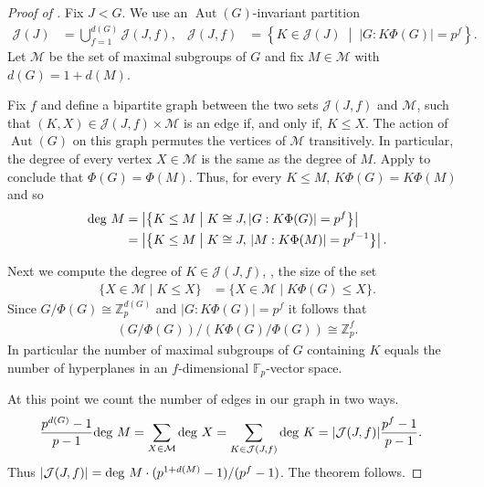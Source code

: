 \documentclass{toc}
\numberwithin{equation}{section}
\theoremstyle{plain}       %
\theoremstyle{remark}
\theoremstyle{definition}
\numberwithin{figure}{section}
\numberwithin{table}{section}
\newcommand{\bbF}{\mathbb{F}}  %
\DeclareMathOperator{\Aut}{Aut}  %
\begin{document}
\begin{proof}[Proof of ]
Fix $J<G$.  We use an $\Aut(G)$-invariant partition
\begin{align*}
	\mathcal{J}(J) & = \bigcup_{f=1}^{d(G)} \mathcal{J}(J,f),
&	\mathcal{J}(J,f) & = 
		\left\{K \in \mathcal{J}(J) \;\middle|\; |G:K\Phi(G)|=p^f\right\}.
\end{align*}
Let $\mathcal{M}$ be the set of maximal subgroups of $G$ and fix $M\in \mathcal{M}$ with $d(G)=1+d(M)$.

%
Fix $f$ and define a bipartite graph between the two sets $\mathcal{J}(J,f)$ and
$\mathcal{M}$, such that $(K,X)\in \mathcal{J}(J,f)\times \mathcal{M}$ is an
edge if, and only if, $K\leq X$.  The action of $\Aut(G)$ on this graph permutes
the vertices of $\mathcal{M}$ transitively.  In particular, the degree of every
vertex $X\in \mathcal{M}$  is the same as the degree of $M$.  Apply
 to conclude that $\Phi(G)=\Phi(M)$.  Thus, for every
$K\leq M$, $K\Phi(G)=K\Phi(M)$ and so
\begin{align*}
	{\rm deg}~M & = \left|\left\{ 
			K\leq M \;\middle|\; K\cong J, |G:K\Phi(G)|=p^f 
	\right\}\right|\\
		& = \left|\left\{ K\leq M \;\middle|\; 
		K\cong J,\, |M:K\Phi(M)|=p^{f-1} \right\}\right|.
\end{align*}

Next we compute the degree of $K\in \mathcal{J}(J,f)$, \ie, the
size of the set
\begin{align*}
	\{ X\in \mathcal{M} \mid K\leq X\}
		& = 	\{ X\in \mathcal{M} \mid K\Phi(G)\leq X\}.
\end{align*}
Since $G/\Phi(G)\cong \mathbb{Z}_p^{d(G)}$ and $|G:K\Phi(G)|=p^f$
it follows that
\begin{align*}
	 (G/\Phi(G))/(K\Phi(G)/\Phi(G))\cong 
		\mathbb{Z}_p^{f}.
\end{align*}
In particular the number of maximal subgroups of $G$ containing $K$ equals the number of hyperplanes in an $f$-dimensional $\bbF_p$-vector space.  

At this point we count the number of edges in our graph in two ways.
\begin{align*}
	\frac{p^{d(G)}-1}{p-1}{\rm deg}~M & = 
		\sum_{X\in \mathcal{M}} {\rm deg}~X
		 =	\sum_{K\in \mathcal{J}(J,f)} {\rm deg}~K
		 = |\mathcal{J}(J,f)|\frac{p^{f}-1}{p-1}.
\end{align*}
Thus $|\mathcal{J}(J,f)|= {\rm deg}~M\cdot(p^{1+d(M)}-1)/(p^{f}-1)$.  The theorem follows.
\end{proof}
\end{document}
